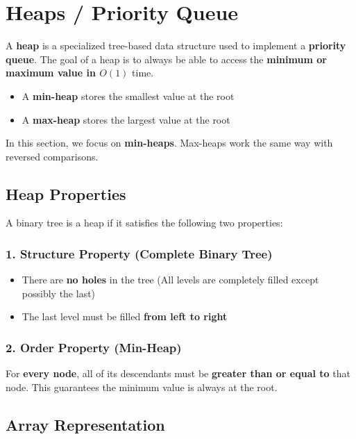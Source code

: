 \section{Heaps / Priority Queue}

A \textbf{heap} is a specialized tree-based data structure used to implement a \textbf{priority queue}.  
The goal of a heap is to always be able to access the \textbf{minimum or maximum value in $O(1)$} time.

\begin{itemize}
  \item A \textbf{min-heap} stores the smallest value at the root
  \item A \textbf{max-heap} stores the largest value at the root
\end{itemize}

In this section, we focus on \textbf{min-heaps}. Max-heaps work the same way with reversed comparisons.

\subsection{Heap Properties}

A binary tree is a heap if it satisfies the following two properties:

\subsubsection*{1. Structure Property (Complete Binary Tree)}
\begin{itemize}
  \item There are \textbf{no holes} in the tree (All levels are completely filled except possibly the last)
  \item The last level must be filled \textbf{from left to right}
\end{itemize}

\subsubsection*{2. Order Property (Min-Heap)}
For \textbf{every node}, all of its descendants must be \textbf{greater than or equal to} that node.  
This guarantees the minimum value is always at the root.

\subsection{Array Representation}

